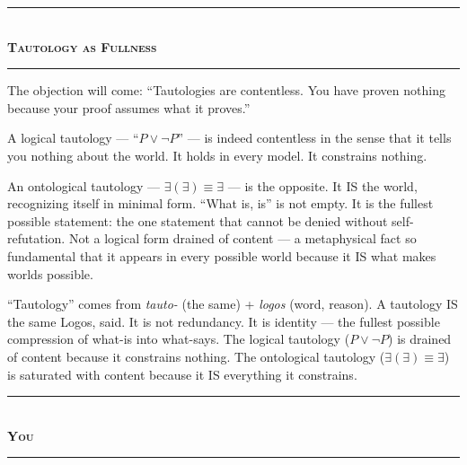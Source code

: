 \documentclass[10pt, openany, oneside]{book}
\renewcommand{\normalsize}{\fontsize{10}{13}\selectfont}
\begin{document}
\vspace{1.5em}


\begin{center}
    \rule{0.3\textwidth}{0.4pt}\\[0.5em]
    {\normalsize\bfseries\scshape Tautology as Fullness}\\[0.3em]
    \rule{0.3\textwidth}{0.4pt}
\end{center}

\vspace{1em}

\noindent The objection will come: ``Tautologies are contentless. You have proven nothing because your proof assumes what it proves.''

A logical tautology --- ``$P \vee \neg P$'' --- is indeed contentless in the sense that it tells you nothing about the world. It holds in every model. It constrains nothing.

An ontological tautology --- $\exists(\exists) \equiv \exists$ --- is the opposite. It IS the world, recognizing itself in minimal form. ``What is, is'' is not empty. It is the fullest possible statement: the one statement that cannot be denied without self-refutation. Not a logical form drained of content --- a metaphysical fact so fundamental that it appears in every possible world because it IS what makes worlds possible.

``Tautology'' comes from \textit{tauto-} (the same) + \textit{logos} (word, reason). A tautology IS the same Logos, said. It is not redundancy. It is identity --- the fullest possible compression of what-is into what-says. The logical tautology ($P \vee \neg P$) is drained of content because it constrains nothing. The ontological tautology ($\exists(\exists) \equiv \exists$) is saturated with content because it IS everything it constrains.

\vspace{1.5em}


\begin{center}
    \rule{0.3\textwidth}{0.4pt}\\[0.5em]
    {\normalsize\bfseries\scshape You}\\[0.3em]
    \rule{0.3\textwidth}{0.4pt}
\end{center}
\end{document}
